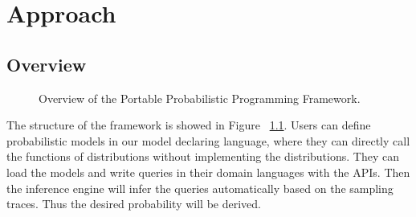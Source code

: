 \chapter{Approach}
\label{chap:approach}

\section{Overview}
\label{sec:overview}

\begin{figure}
    \centering
    \caption{Overview of the Portable Probabilistic Programming Framework.}
    \label{fig:overview}
\end{figure}

The structure of the framework is showed in Figure ~\ref{fig:overview}. Users can define probabilistic models in our model declaring language, where they can directly call the functions of distributions without implementing the distributions. They can load the models and write queries in their domain languages with the APIs. Then the inference engine will infer the queries automatically based on the sampling traces. Thus the desired probability will be derived.

